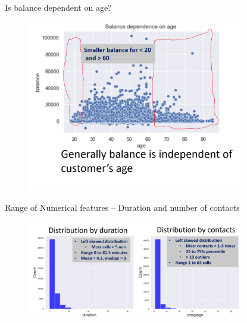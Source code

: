\begin{frame}{Is balance dependent on age?}


	\begin{figure}
		
		\includegraphics[width=9.50cm]{figures/fig_age_balance_scatter.png}
	\end{figure}


\end{frame}


\begin{frame}{Range of Numerical features – Duration and number of contacts}


	\begin{figure}
		
		\includegraphics[width=9.50cm]{figures/fig_duration_campaign_count.png}
	\end{figure}


\end{frame}


